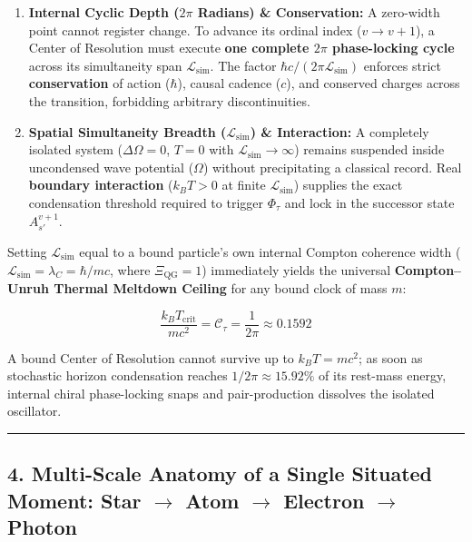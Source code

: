 \documentclass[
]{article}
\providecommand{\tightlist}{%
  \setlength{\itemsep}{0pt}\setlength{\parskip}{0pt}}
\begin{document}
\begin{enumerate}
\def\labelenumi{\arabic{enumi}.}
\tightlist
\item
  \textbf{Internal Cyclic Depth (\(2\pi\) Radians) \& Conservation:} A
  zero-width point cannot register change. To advance its ordinal index
  (\(v \to v + 1\)), a Center of Resolution must execute \textbf{one
  complete \(2\pi\) phase-locking cycle} across its simultaneity span
  \(\mathcal{L}_{\mathrm{sim}}\). The factor
  \(\hbar c / (2\pi \mathcal{L}_{\mathrm{sim}})\) enforces strict
  \textbf{conservation} of action (\(\hbar\)), causal cadence (\(c\)),
  and conserved charges across the transition, forbidding arbitrary
  discontinuities.
\item
  \textbf{Spatial Simultaneity Breadth (\(\mathcal{L}_{\mathrm{sim}}\))
  \& Interaction:} A completely isolated system (\(\Delta\Omega = 0\),
  \(T = 0\) with \(\mathcal{L}_{\mathrm{sim}} \to \infty\)) remains
  suspended inside uncondensed wave potential (\(\Omega\)) without
  precipitating a classical record. Real \textbf{boundary interaction}
  (\(k_B T > 0\) at finite \(\mathcal{L}_{\mathrm{sim}}\)) supplies the
  exact condensation threshold required to trigger \(\Phi_\tau\) and
  lock in the successor state \(A_{s'}^{v+1}\).
\end{enumerate}

Setting \(\mathcal{L}_{\mathrm{sim}}\) equal to a bound particle's own
internal Compton coherence width
(\(\mathcal{L}_{\mathrm{sim}} = \lambda_C = \hbar / mc\), where
\(\Xi_{\mathrm{QG}} = 1\)) immediately yields the universal
\textbf{Compton--Unruh Thermal Meltdown Ceiling} for any bound clock of
mass \(m\):

\[\frac{k_B T_{\mathrm{crit}}}{m c^2} = \mathcal{C}_\tau = \frac{1}{2\pi} \approx 0.1592\]

A bound Center of Resolution cannot survive up to \(k_B T = m c^2\); as
soon as stochastic horizon condensation reaches
\(1/2\pi \approx 15.92\%\) of its rest-mass energy, internal chiral
phase-locking snaps and pair-production dissolves the isolated
oscillator.

\begin{center}\rule{0.5\linewidth}{0.5pt}\end{center}

\subsection{\texorpdfstring{4. Multi-Scale Anatomy of a Single Situated
Moment: Star \(\to\) Atom \(\to\) Electron \(\to\)
Photon}{4. Multi-Scale Anatomy of a Single Situated Moment: Star \textbackslash to Atom \textbackslash to Electron \textbackslash to Photon}}\label{multi-scale-anatomy-of-a-single-situated-moment-star-to-atom-to-electron-to-photon}
\end{document}
